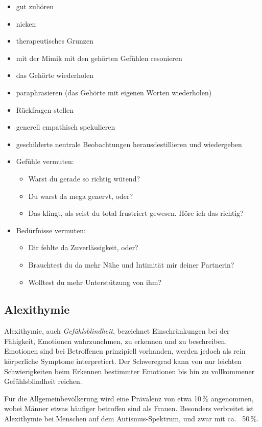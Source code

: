 \begin{itemize}
  \item gut zuhören
  \item nicken
  \item \glqq therapeutisches Grunzen\grqq
  \item mit der Mimik mit den gehörten Gefühlen resonieren
  \item das Gehörte wiederholen
  \item paraphrasieren (das Gehörte mit eigenen Worten wiederholen) 
  \item Rückfragen stellen
  \item generell \glqq empathisch spekulieren\grqq
  \item geschilderte neutrale Beobachtungen herausdestillieren und wiedergeben
  \item Gefühle vermuten:
    \begin{itemize}
      \item \glqq Warst du gerade so richtig wütend?\grqq
      \item \glqq Du warst da mega genervt, oder?\grqq
      \item \glqq Das klingt, als seist du total frustriert gewesen. Höre ich das richtig?\grqq
    \end{itemize}
  \item Bedürfnisse vermuten:
    \begin{itemize}
      \item \glqq Dir fehlte da Zuverlässigkeit, oder?\grqq
      \item \glqq Brauchtest du da mehr Nähe und Intimität mir deiner Partnerin?\grqq
      \item \glqq Wolltest du mehr Unterstützung von ihm?\grqq
    \end{itemize}
\end{itemize}



\subsection{Alexithymie}
\label{alexithymie}

Alexithymie, auch \emph{Gefühlsblindheit}, bezeichnet Einschränkungen bei der Fähigkeit, Emotionen wahrzunehmen, zu erkennen und zu beschreiben. Emotionen sind bei Betroffenen prinzipiell vorhanden, werden jedoch als rein körperliche Symptome interpretiert. Der Schweregrad kann von nur leichten Schwierigkeiten beim Erkennen bestimmter Emotionen bis hin zu vollkommener \glqq Gefühlsblindheit\grqq{} reichen.

Für die Allgemeinbevölkerung wird eine Prävalenz von etwa 10\,\% angenommen, wobei Männer etwas häufiger betroffen sind als Frauen. Besonders verbreitet ist Alexithymie bei Menschen auf dem Autismus-Spektrum, und zwar mit ca.~ 50\,\%.
